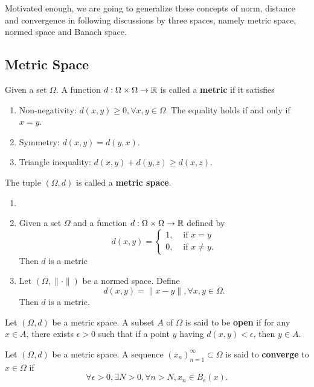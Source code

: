 Motivated enough, we are going to generalize these concepts of norm, distance and convergence in following discussions by three spaces, namely metric space, normed space and Banach space.

\subsection{Metric Space}

\begin{definition}
 Given a set $\Omega$. A function $d:\Omega\times\Omega\to\mathbb{R}$ is called a \textbf{metric} if it satisfies
 \begin{enumerate}
  \item Non-negativity: $d(x,y)\ge 0,\forall x,y\in\Omega$. The equality holds if and only if $x=y$.
  \item Symmetry: $d(x,y)=d(y,x)$.
  \item Triangle inequality: $d(x,y)+d(y,z)\ge d(x,z)$.
 \end{enumerate}
 The tuple $(\Omega,d)$ is called a \textbf{metric space}.
\end{definition}

\begin{example}
 \begin{enumerate}
  \item []
  \item Given a set $\Omega$ and a function $d:\Omega\times\Omega\to\mathbb{R}$ defined by
        $$d(x,y)=\begin{cases}
          1, & \text{ if } x=y     \\
          0, & \text{ if } x\ne y.
         \end{cases}$$
        Then $d$ is a metric
  \item Let $(\Omega, \|\cdot\|)$ be a normed space. Define $$d(x,y) = \|x-y\|, \forall x,y\in\Omega.$$
        Then $d$ is a metric.
 \end{enumerate}
\end{example}

\begin{definition}
 Let $(\Omega, d)$ be a metric space. A subset $A$ of $\Omega$ is said to be \textbf{open} if for any $x\in A$, there exists $\epsilon > 0$ such that if a point $y$ having $d(x, y)<\epsilon$, then $y\in A$.
\end{definition}

\begin{definition}
 Let $(\Omega, d)$ be a metric space. A sequence $(x_n)_{n=1}^\infty\subset\Omega$ is said to \textbf{converge} to $x\in\Omega$ if
 $$\forall \epsilon>0, \exists N>0,\forall n> N, x_n\in B_\epsilon(x).$$
\end{definition}

